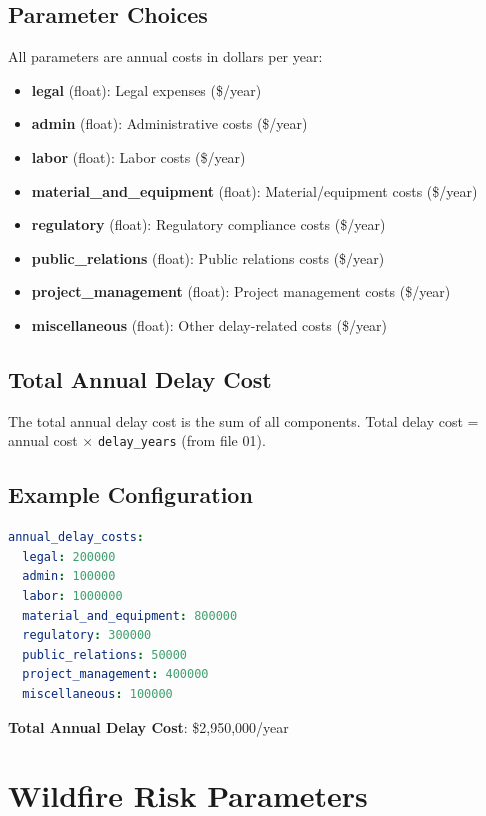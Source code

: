\documentclass[ctcc_full_documentation.tex]{subfiles}
\begin{document}
\subsection{Parameter Choices}

All parameters are annual costs in dollars per year:

\begin{itemize}
    \item \textbf{legal} (float): Legal expenses (\$/year)
    \item \textbf{admin} (float): Administrative costs (\$/year)
    \item \textbf{labor} (float): Labor costs (\$/year)
    \item \textbf{material\_and\_equipment} (float): Material/equipment costs (\$/year)
    \item \textbf{regulatory} (float): Regulatory compliance costs (\$/year)
    \item \textbf{public\_relations} (float): Public relations costs (\$/year)
    \item \textbf{project\_management} (float): Project management costs (\$/year)
    \item \textbf{miscellaneous} (float): Other delay-related costs (\$/year)
\end{itemize}

\subsection{Total Annual Delay Cost}

The total annual delay cost is the sum of all components. Total delay cost = annual cost × \texttt{delay\_years} (from file 01).

\subsection{Example Configuration}

\begin{lstlisting}[language=yaml]
annual_delay_costs:
  legal: 200000
  admin: 100000
  labor: 1000000
  material_and_equipment: 800000
  regulatory: 300000
  public_relations: 50000
  project_management: 400000
  miscellaneous: 100000
\end{lstlisting}

\textbf{Total Annual Delay Cost}: \$2,950,000/year

\section{Wildfire Risk Parameters}
\label{sec:wildfire}
\end{document}
